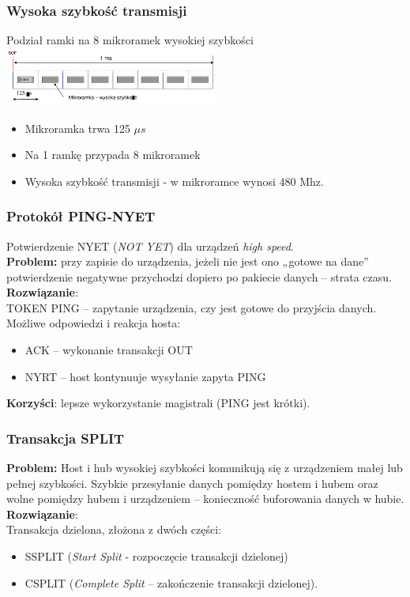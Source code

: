 \documentclass[a4paper,twoside]{article}
\begin{document}
	\subsubsection{Wysoka szybkość transmisji}
	Podział ramki na 8 mikroramek wysokiej szybkości\\
	\includegraphics[width=7cm]{./wyklady/USB_53_1.pdf}
	\begin{itemize}
		\item Mikroramka trwa 125 $\mu s$
		\item Na 1 ramkę przypada 8 mikroramek
		\item Wysoka szybkość transmisji - w mikroramce wynosi 480 Mhz.
	\end{itemize}
	\subsubsection{Protokół PING-NYET}
	Potwierdzenie NYET (\emph{NOT YET}) dla urządzeń \emph{high speed}.\\
	\textbf{Problem:} przy zapisie do urządzenia, jeżeli nie jest ono „gotowe na dane” potwierdzenie negatywne przychodzi dopiero po pakiecie danych – strata czasu.\\
	\textbf{Rozwiązanie}:\\
	TOKEN PING – zapytanie urządzenia, czy jest gotowe do przyjścia danych.\\
	Możliwe odpowiedzi i reakcja hosta:
	\begin{itemize}
		\item ACK – wykonanie transakcji OUT
		\item NYRT – host kontynuuje wysyłanie zapyta PING
	\end{itemize}
	\textbf{Korzyści}: lepsze wykorzystanie magistrali (PING jest krótki).
	\subsubsection{Transakcja SPLIT}
	\textbf{Problem:} Host i hub wysokiej szybkości komunikują się z urządzeniem małej lub pełnej szybkości. Szybkie przesyłanie danych pomiędzy hostem i hubem oraz wolne pomiędzy hubem i urządzeniem – konieczność buforowania danych w hubie.\\
	\textbf{Rozwiązanie}:\\
	Transakcja dzielona, złożona z dwóch części:
	\begin{itemize}
		\item SSPLIT (\emph{Start Split} - rozpoczęcie transakcji dzielonej)
		\item CSPLIT (\emph{Complete Split} – zakończenie transakcji dzielonej).
	\end{itemize}
\end{document}

